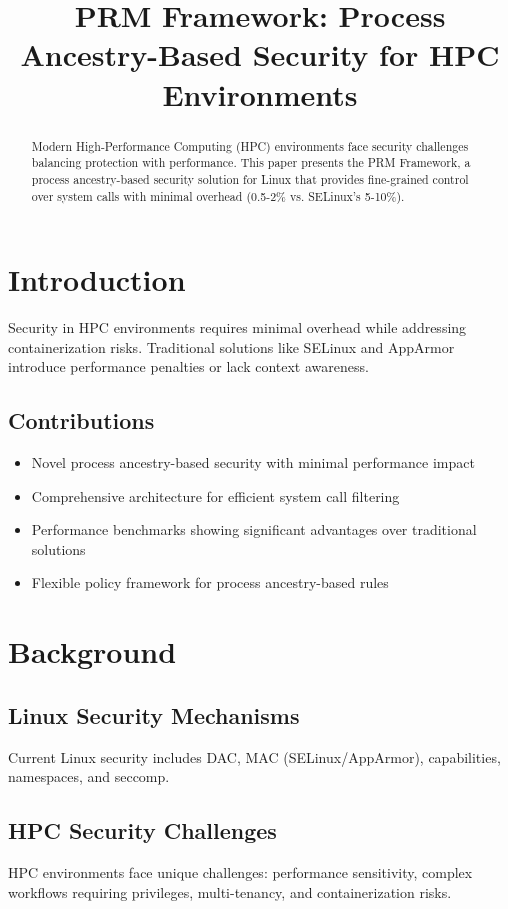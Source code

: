 \documentclass{article}
\title{PRM Framework: Process Ancestry-Based Security for HPC Environments}
\author{}
\date{}
\begin{document}
\maketitle

\begin{abstract}
Modern High-Performance Computing (HPC) environments face security challenges balancing protection with performance. This paper presents the PRM Framework, a process ancestry-based security solution for Linux that provides fine-grained control over system calls with minimal overhead (0.5-2\% vs. SELinux's 5-10\%).
\end{abstract}

\section{Introduction}
Security in HPC environments requires minimal overhead while addressing containerization risks. Traditional solutions like SELinux and AppArmor introduce performance penalties or lack context awareness.

\subsection{Contributions}
\begin{itemize}
\item Novel process ancestry-based security with minimal performance impact
\item Comprehensive architecture for efficient system call filtering
\item Performance benchmarks showing significant advantages over traditional solutions
\item Flexible policy framework for process ancestry-based rules
\end{itemize}

\section{Background}
\subsection{Linux Security Mechanisms}
Current Linux security includes DAC, MAC (SELinux/AppArmor), capabilities, namespaces, and seccomp.

\subsection{HPC Security Challenges}
HPC environments face unique challenges: performance sensitivity, complex workflows requiring privileges, multi-tenancy, and containerization risks.
\end{document}
